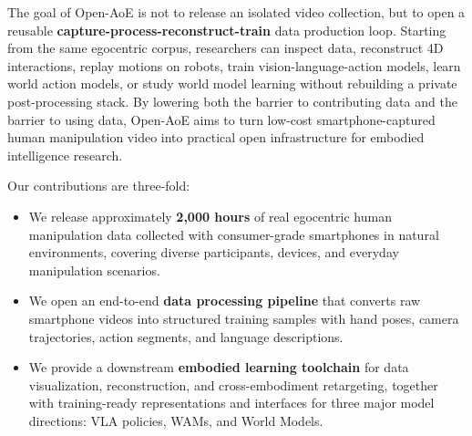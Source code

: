 The goal of Open-AoE is not to release an isolated video collection, but to open a reusable \textbf{capture-process-reconstruct-train} data production loop.
Starting from the same egocentric corpus, researchers can inspect data, reconstruct 4D interactions, replay motions on robots, train vision-language-action models, learn world action models, or study world model learning without rebuilding a private post-processing stack.
By lowering both the barrier to contributing data and the barrier to using data, Open-AoE aims to turn low-cost smartphone-captured human manipulation video into practical open infrastructure for embodied intelligence research.

Our contributions are three-fold:
\begin{itemize}
    \item We release approximately \textbf{2,000 hours} of real egocentric human manipulation data collected with consumer-grade smartphones in natural environments, covering diverse participants, devices, and everyday manipulation scenarios.

    \item We open an end-to-end \textbf{data processing pipeline} that converts raw smartphone videos into structured training samples with hand poses, camera trajectories, action segments, and language descriptions.

    \item We provide a downstream \textbf{embodied learning toolchain} for data visualization, reconstruction, and cross-embodiment retargeting, together with training-ready representations and interfaces for three major model directions: VLA policies, WAMs, and World Models.
\end{itemize}

